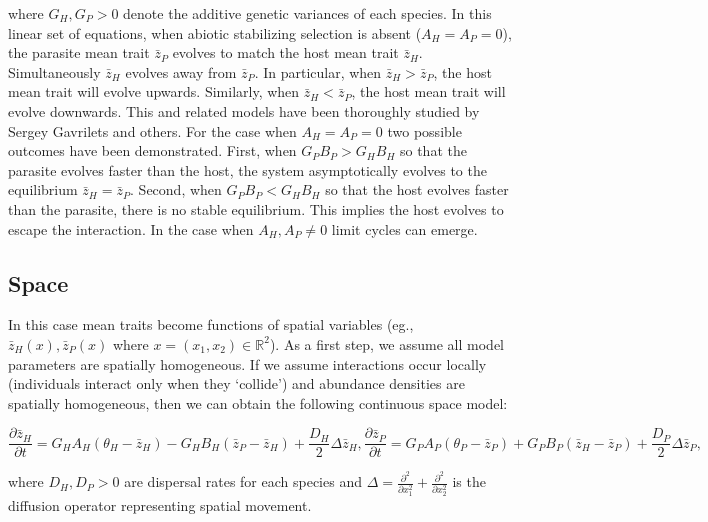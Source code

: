 \documentclass{article}
\begin{document}
where \(G_H,G_P>0\) denote the additive genetic variances of each
species. In this linear set of equations, when abiotic stabilizing
selection is absent (\(A_H=A_P=0\)), the parasite mean trait
\(\bar z_P\) evolves to match the host mean trait \(\bar z_H\).
Simultaneously \(\bar z_H\) evolves away from \(\bar z_P\). In
particular, when \(\bar z_H>\bar z_P\), the host mean trait will evolve
upwards. Similarly, when \(\bar z_H<\bar z_P\), the host mean trait will
evolve downwards. This and related models have been thoroughly studied
by Sergey Gavrilets and others. For the case when \(A_H=A_P=0\) two
possible outcomes have been demonstrated. First, when \(G_PB_P>G_HB_H\)
so that the parasite evolves faster than the host, the system
asymptotically evolves to the equilibrium \(\bar z_H=\bar z_P\). Second,
when \(G_PB_P<G_HB_H\) so that the host evolves faster than the
parasite, there is no stable equilibrium. This implies the host evolves
to escape the interaction. In the case when \(A_H,A_P\neq0\) limit
cycles can emerge.

\hypertarget{space}{%
\subsection{Space}\label{space}}

In this case mean traits become functions of spatial variables (eg.,
\(\bar z_H(x),\bar z_P(x)\) where \(x=(x_1,x_2)\in\mathbb R^2\)). As a
first step, we assume all model parameters are spatially homogeneous. If
we assume interactions occur locally (individuals interact only when
they `collide') and abundance densities are spatially homogeneous, then
we can obtain the following continuous space model:

\begin{subequations}\label{deterministic}
  \begin{equation}
    \frac{\partial\bar z_H}{\partial t}=G_HA_H(\theta_H-\bar z_H)-G_HB_H(\bar z_P-\bar z_H)+\frac{D_H}{2}\Delta\bar z_H,
  \end{equation}
  \begin{equation}
    \frac{\partial\bar z_P}{\partial t}=G_PA_P(\theta_P-\bar z_P)+G_PB_P(\bar z_H-\bar z_P)+\frac{D_P}{2}\Delta\bar z_P,
  \end{equation}
\end{subequations}

where \(D_H,D_P>0\) are dispersal rates for each species and
\(\Delta=\frac{\partial^2}{\partial x_1^2}+\frac{\partial^2}{\partial x_2^2}\)
is the diffusion operator representing spatial movement.
\end{document}
